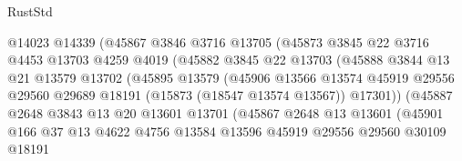\begin{lexlean}{RustStd}
\begin{coremodule}
                            @14023
                            @14339
                            (@45867
                              @3846
                              @3716
                              @13705
                              (@45873
                                @3845
                                @22
                                @3716
                                @4453
                                @13703
                                @4259
                                @4019
                                (@45882
                                  @3845
                                  @22
                                  @13703
                                  (@45888
                                    @3844
                                    @13
                                    @21
                                    @13579
                                    @13702
                                    (@45895
                                      @13579
                                      (@45906
                                        @13566
                                        @13574
                                        @45919
                                        @29556
                                        @29560
                                        @29689
                                        @18191
                                        (@15873 (@18547 @13574 @13567))
                                        @17301))
                                    (@45887
                                      @2648
                                      @3843
                                      @13
                                      @20
                                      @13601
                                      @13701
                                      (@45867
                                        @2648
                                        @13
                                        @13601
                                        (@45901
                                          @166
                                          @37
                                          @13
                                          @4622
                                          @4756
                                          @13584
                                          @13596
                                          @45919
                                          @29556
                                          @29560
                                          @30109
                                          @18191

\end{coremodule}
\end{lexlean}
